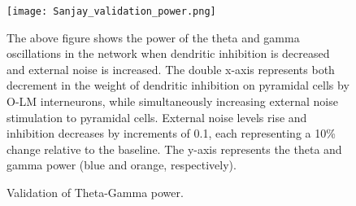 \begin{figure}[htbp]
    \centering
    \texttt{[image: Sanjay\_validation\_power.png]}
    \caption[Validation of the firing rates]{Validation of Theta-Gamma power.}\label{fig:validation_power}
    \begin{minipage}{0.9\textwidth}
        The above figure shows the power of the theta and gamma oscillations in the network when dendritic inhibition is decreased and external noise is increased.
        The double x-axis represents both decrement in the weight of dendritic inhibition on pyramidal cells by O-LM interneurons,
        while simultaneously increasing external noise stimulation to pyramidal cells.
        External noise levels rise and inhibition decreases by increments of 0.1, each representing a 10\% change relative to the baseline.
        The y-axis represents the theta and gamma power (blue and orange, respectively).
    \end{minipage}
\end{figure}

